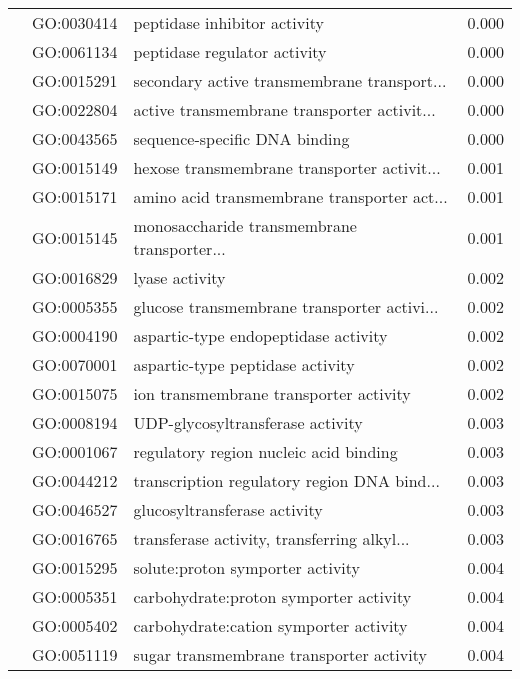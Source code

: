\begin{longtable}{lllr}
   & GO:0030414 &                 peptidase inhibitor activity &         0.000 \\
   & GO:0061134 &                 peptidase regulator activity &         0.000 \\
   & GO:0015291 &  secondary active transmembrane transport... &         0.000 \\
   & GO:0022804 &  active transmembrane transporter activit... &         0.000 \\
   & GO:0043565 &                sequence-specific DNA binding &         0.000 \\
   & GO:0015149 &  hexose transmembrane transporter activit... &         0.001 \\
   & GO:0015171 &  amino acid transmembrane transporter act... &         0.001 \\
   & GO:0015145 &  monosaccharide transmembrane transporter... &         0.001 \\
   & GO:0016829 &                               lyase activity &         0.002 \\
   & GO:0005355 &  glucose transmembrane transporter activi... &         0.002 \\
   & GO:0004190 &         aspartic-type endopeptidase activity &         0.002 \\
   & GO:0070001 &             aspartic-type peptidase activity &         0.002 \\
   & GO:0015075 &       ion transmembrane transporter activity &         0.002 \\
   & GO:0008194 &             UDP-glycosyltransferase activity &         0.003 \\
   & GO:0001067 &       regulatory region nucleic acid binding &         0.003 \\
   & GO:0044212 &  transcription regulatory region DNA bind... &         0.003 \\
   & GO:0046527 &                 glucosyltransferase activity &         0.003 \\
   & GO:0016765 &  transferase activity, transferring alkyl... &         0.003 \\
   & GO:0015295 &             solute:proton symporter activity &         0.004 \\
   & GO:0005351 &       carbohydrate:proton symporter activity &         0.004 \\
   & GO:0005402 &       carbohydrate:cation symporter activity &         0.004 \\
   & GO:0051119 &     sugar transmembrane transporter activity &         0.004 \\

\end{longtable}
